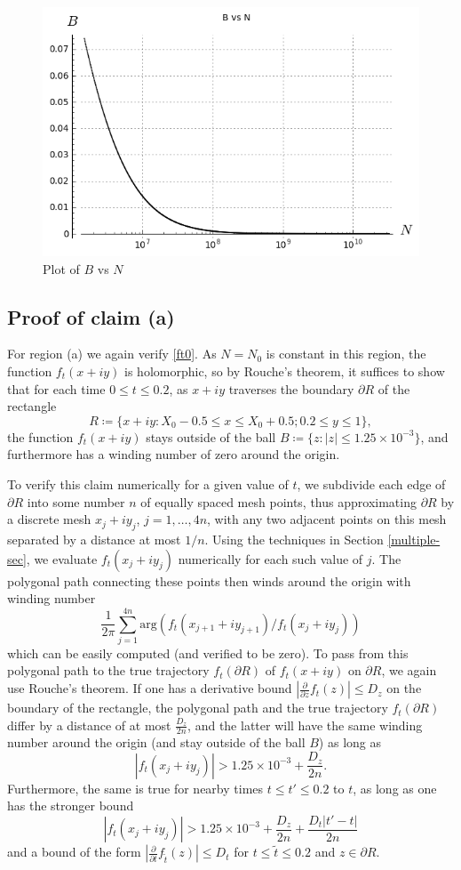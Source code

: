 \documentclass[a4paper,11pt,twoside]{amsart}
\begin{document}
\begin{figure}[ht!]
  \includegraphics[width=0.7\linewidth]{B_vs_N.png}
  \caption{Plot of $B$ vs $N$}\label{bnp}
\end{figure}


\subsection{Proof of claim (a)}\label{barrier-sec}

For region (a) we again verify \eqref{ft0}.
As $N = N_0$ is constant in this region, the function $f_t(x+iy)$ is holomorphic, so by Rouche's theorem, it suffices to show that for each time $0 \leq t \leq 0.2$, as $x+iy$ traverses the boundary $\partial R$ of the rectangle 
$$ R \coloneqq \{ x+iy: X_0 - 0.5 \leq x \leq X_0 + 0.5; 0.2 \leq y \leq 1 \},$$
the function $f_t(x+iy)$ stays outside of the ball $B \coloneqq \{ z: |z| \leq 1.25 \times 10^{-3} \}$, and furthermore has a winding number of zero around the origin.

To verify this claim numerically for a given value of $t$, we subdivide each edge of $\partial R$ into some number $n$ of equally spaced mesh points, thus approximating $\partial R$ by a discrete mesh $x_j+iy_j$, $j=1,\dots,4n$, with any two adjacent points on this mesh separated by a distance at most $1/n$.  Using the techniques in Section \ref{multiple-sec}, we evaluate $f_t(x_j+iy_j)$ numerically for each such value of $j$.  The polygonal path connecting these points then winds around the origin with winding number
$$ \frac{1}{2\pi} \sum_{j=1}^{4n} \mathrm{arg}( f_t(x_{j+1}+iy_{j+1}) / f_t(x_j + i y_j) )$$
which can be easily computed (and verified to be zero).  To pass from this polygonal path to the true trajectory $f_t(\partial R)$ of $f_t(x+iy)$ on $\partial R$, we again use Rouche's theorem.  If one has a derivative bound $|\frac{\partial}{\partial z} f_t(z)| \leq D_z$ on the boundary of the rectangle, the polygonal path and the true trajectory $f_t(\partial R)$ differ by a distance of at most $\frac{D_z}{2n}$, and the latter will have the same winding number around the origin (and stay outside of the ball $B$) as long as
$$ |f_t(x_j + iy_j)| > 1.25 \times 10^{-3} + \frac{D_z}{2n}.$$
Furthermore, the same is true for nearby times $t \leq t' \leq 0.2$ to $t$, as long as one has the stronger bound
\begin{equation}\label{cond}
 |f_t(x_j + iy_j)| > 1.25 \times 10^{-3} + \frac{D_z}{2n} + \frac{D_t |t'-t|}{2n}
\end{equation}
and a bound of the form $|\frac{\partial}{\partial t} f_{\tilde t}(z)| \leq D_t$
for $t \leq \tilde t \leq 0.2$ and $z \in \partial R$.
\end{document}
